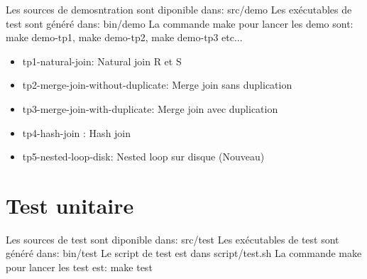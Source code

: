 \documentclass[a4paper]{article}
\begin{document}
Les sources de demosntration sont diponible dans: src/demo
Les exécutables de test sont généré dans: bin/demo
La commande make pour lancer les demo sont: make demo-tp1, make demo-tp2, make demo-tp3 etc...

\begin{itemize}
  \item tp1-natural-join: Natural join R et S
  \item tp2-merge-join-without-duplicate: Merge join sans duplication 
  \item tp3-merge-join-with-duplicate: Merge join avec duplication 
  \item tp4-hash-join : Hash join 
  \item tp5-nested-loop-disk: Nested loop sur disque  (Nouveau)
\end{itemize}

\section{Test unitaire}

Les sources de test sont diponible dans: src/test
Les exécutables de test sont généré dans: bin/test
Le script de test est dans script/test.sh
La commande make pour lancer les test est: make test
\end{document}
